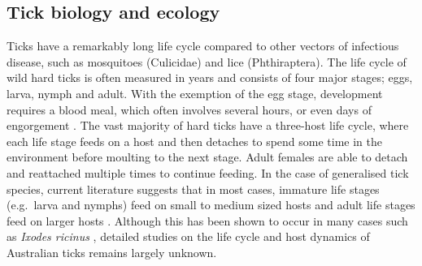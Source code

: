 \documentclass[a4paper, nobind]{templates/ociamthesis}
\begin{document}
\hypertarget{tick-biology-and-ecology}{%
\subsection{Tick biology and ecology}\label{tick-biology-and-ecology}}

Ticks have a remarkably long life cycle compared to other vectors of infectious disease, such as mosquitoes (Culicidae) and lice (Phthiraptera).
The life cycle of wild hard ticks is often measured in years and consists of four major stages; eggs, larva, nymph and adult.
With the exemption of the egg stage, development requires a blood meal, which often involves several hours, or even days of engorgement \autocite{cuppBiologyTicks1991}.
The vast majority of hard ticks have a three-host life cycle, where each life stage feeds on a host and then detaches to spend some time in the environment before moulting to the next stage.
Adult females are able to detach and reattached multiple times to continue feeding.
In the case of generalised tick species, current literature suggests that in most cases, immature life stages (e.g.~larva and nymphs) feed on small to medium sized hosts and adult life stages feed on larger hosts \autocite{apanaskevichLifeCyclesNatural2014}.
Although this has been shown to occur in many cases such as \emph{Ixodes ricinus} \autocite{krasnovHostCommunityStructure2007}, detailed studies on the life cycle and host dynamics of Australian ticks remains largely unknown.
\end{document}

